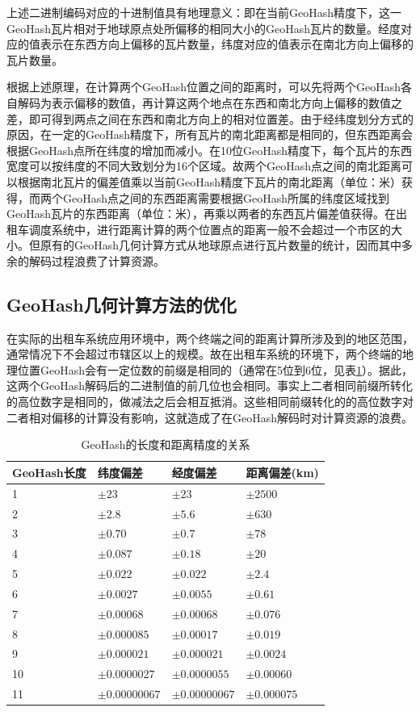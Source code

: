 上述二进制编码对应的十进制值具有地理意义：即在当前GeoHash精度下，这一GeoHash瓦片相对于地球原点处所偏移的相同大小的GeoHash瓦片的数量。经度对应的值表示在东西方向上偏移的瓦片数量，纬度对应的值表示在南北方向上偏移的瓦片数量。

根据上述原理，在计算两个GeoHash位置之间的距离时，可以先将两个GeoHash各自解码为表示偏移的数值，再计算这两个地点在东西和南北方向上偏移的数值之差，即可得到两点之间在东西和南北方向上的相对位置差。由于经纬度划分方式的原因，在一定的GeoHash精度下，所有瓦片的南北距离都是相同的，但东西距离会根据GeoHash点所在纬度的增加而减小。在10位GeoHash精度下，每个瓦片的东西宽度可以按纬度的不同大致划分为16个区域。故两个GeoHash点之间的南北距离可以根据南北瓦片的偏差值乘以当前GeoHash精度下瓦片的南北距离（单位：米）获得，而两个GeoHash点之间的东西距离需要根据GeoHash所属的纬度区域找到GeoHash瓦片的东西距离（单位：米），再乘以两者的东西瓦片偏差值获得。在出租车调度系统中，进行距离计算的两个位置点的距离一般不会超过一个市区的大小。但原有的GeoHash几何计算方式从地球原点进行瓦片数量的统计，因而其中多余的解码过程浪费了计算资源。

\subsection{GeoHash几何计算方法的优化}
在实际的出租车系统应用环境中，两个终端之间的距离计算所涉及到的地区范围，通常情况下不会超过市辖区以上的规模。故在出租车系统的环境下，两个终端的地理位置GeoHash会有一定位数的前缀是相同的（通常在5位到6位，见表\ref{tab:GeoHashScale}）。据此，这两个GeoHash解码后的二进制值的前几位也会相同。事实上二者相同前缀所转化的高位数字是相同的，做减法之后会相互抵消。这些相同前缀转化的的高位数字对二者相对偏移的计算没有影响，这就造成了在GeoHash解码时对计算资源的浪费。

\begin{table}
  \centering
  \caption{GeoHash的长度和距离精度的关系}\label{tab:GeoHashScale}
  \begin{tabular*}{0.9\textwidth}{@{\extracolsep{\fill}}llll}
  \toprule
    GeoHash长度    &纬度偏差 &经度偏差 &距离偏差(km) \\
  \midrule
    1    &$\pm23$ &$\pm23$ &$\pm2500$\\
    2    &$\pm2.8$ &$\pm5.6$ &$\pm630$\\
    3    &$\pm0.70$ &$\pm0.7$ &$\pm78$\\
    4    &$\pm0.087$ &$\pm0.18$ &$\pm20$\\
    5    &$\pm0.022$ &$\pm0.022$ &$\pm2.4$\\
    6    &$\pm0.0027$ &$\pm0.0055$ &$\pm0.61$\\
    7    &$\pm0.00068$ &$\pm0.00068$ &$\pm0.076$\\
    8    &$\pm0.000085$ &$\pm0.00017$ &$\pm0.019$\\
    9    &$\pm0.000021$ &$\pm0.000021$ &$\pm0.0024$\\
    10    &$\pm0.0000027$ &$\pm0.0000055$ &$\pm0.00060$\\
    11    &$\pm0.00000067$ &$\pm0.00000067$ &$\pm0.000075$\\
  \bottomrule
  \end{tabular*}
\end{table}

